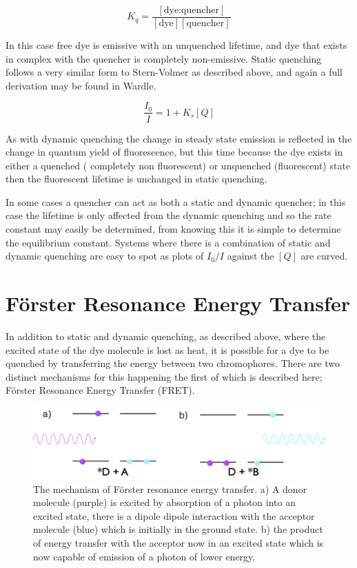 \documentclass[
]{book}
\begin{document}
\begin{equation*}
K_q = \frac{[\textrm{dye:quencher}]}{[\textrm{dye}][\textrm{quencher}]} 
\end{equation*}

In this case free dye is emissive with an unquenched lifetime, and dye that exists in complex with the quencher is completely non-emissive. Static quenching follows a very similar form to Stern-Volmer as described above, and again a full derivation may be found in Wardle.

\begin{equation}
\frac{I_0}{I}=1 + K_s [Q]
\label{eq:SternVolmerstatic}
\end{equation}

As with dynamic quenching the change in steady state emission is reflected in the change in quantum yield of fluorescence, but this time because the dye exists in either a quenched ( completely non fluorescent) or unquenched (fluorescent) state then the fluorescent lifetime is unchanged in static quenching.

In some cases a quencher can act as both a static and dynamic quencher; in this case the lifetime is only affected from the dynamic quenching and so the rate constant may easily be determined, from knowing this it is simple to determine the equilibrium constant. Systems where there is a combination of static and dynamic quenching are easy to spot as plots of \(I_0 / I\) against the \([Q]\) are curved.

\hypertarget{sec:forster}{%
\section{Förster Resonance Energy Transfer}\label{sec:forster}}

In addition to static and dynamic quenching, as described above, where the excited state of the dye molecule is lost as heat, it is possible for a dye to be quenched by transferring the energy between two chromophores. There are two distinct mechanisms for this happening the first of which is described here; Förster Resonance Energy Transfer (FRET).

\begin{figure}

{\centering \includegraphics[width=0.7\linewidth]{images/forster} 

}

\caption{The mechanism of Förster resonance energy transfer. a) A donor molecule (purple) is excited by absorption of a photon into an excited state, there is a dipole dipole interaction with the acceptor molecule (blue) which is initially in the ground state. b) the product of energy transfer with the acceptor now in an excited state which is now capable of emission of a photon of lower energy.}\label{fig:forster}
\end{figure}
\end{document}
